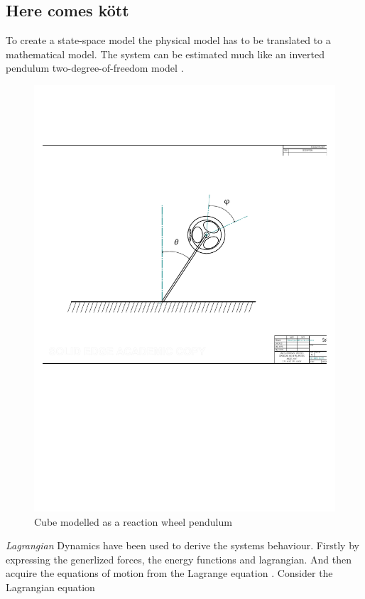 \documentclass[a4paper,11pt]{kth-mag}
\begin{document}
\subsection{Here comes kött}
To create a state-space model the physical model has to be translated to a mathematical model. The system can be estimated much like an inverted pendulum two-degree-of-freedom model \cite{KTHpendulum}.
\begin{figure}[!htb]
\centering
\includegraphics[scale=.6]{Lagrangeflywheel.pdf}
\caption{Cube modelled as a reaction wheel pendulum}
\label{fig:Lagrangeflywheel}
\end{figure}

\emph{Lagrangian} Dynamics have been used to derive the systems behaviour. Firstly by expressing the generlized forces, the energy functions and lagrangian. And then acquire the equations of motion from the Lagrange equation  \cite{Lagrangeref}. Consider the Lagrangian equation
\end{document}
